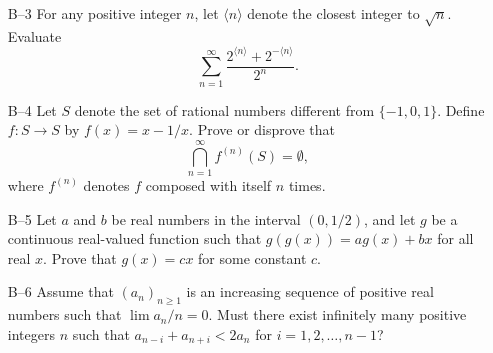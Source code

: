 \documentclass[amssymb,twocolumn,pra,10pt,aps]{revtex4-1}
\begin{document}
\begin{itemize}
\item[B--3]
For any positive integer $n$, let $\langle n\rangle$ denote
the closest integer to $\sqrt{n}$.  Evaluate
\[\sum_{n=1}^\infty \frac{2^{\langle n\rangle}+2^{-\langle n\rangle}}
                         {2^n}.\]

\item[B--4]
Let $S$ denote the set of rational numbers different from
$\{-1,0,1\}$.  Define $f:S\rightarrow S$ by $f(x)=x-1/x$.  Prove
or disprove that
\[\bigcap_{n=1}^\infty f^{(n)}(S) = \emptyset,\]
where $f^{(n)}$ denotes $f$ composed with itself $n$ times.

\item[B--5]
Let $a$ and $b$ be real numbers in the interval $(0,1/2)$, and
let $g$ be a continuous real-valued function such that
$g(g(x))= ag(x)+bx$ for all real $x$.  Prove that
$g(x)=cx$ for some constant $c$.

\item[B--6]
Assume that $(a_n)_{n\geq 1}$ is an increasing sequence of
positive real numbers such that
$\lim a_n/n=0$.  Must there exist infinitely many positive integers
$n$ such that $a_{n-i}+a_{n+i}<2a_n$ for $i=1,2,\ldots,n-1$?

\end{itemize}
\end{document}
